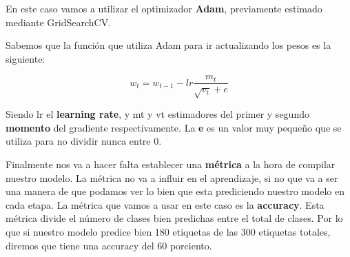 En este caso vamos a utilizar el optimizador \textbf{Adam}, previamente estimado mediante GridSearchCV.

\vspace{5 mm}

Sabemos que la función que utiliza Adam para ir actualizando los pesos es la siguiente:

\[w_t = w_{t-1} - lr  \frac{m_t}{\sqrt{v_t} + e} \]

Siendo lr el \textbf{learning rate}, y mt y vt estimadores del primer y segundo \textbf{momento} del gradiente respectivamente. La \textbf{e} es un valor muy pequeño que se utiliza para no dividir nunca entre 0.

\vspace{5 mm}

Finalmente nos va a hacer falta establecer una \textbf{métrica} a la hora de compilar nuestro modelo. La métrica no va a influir en el aprendizaje, si no que va a ser una manera de que podamos ver lo bien que esta prediciendo nuestro modelo en cada etapa. La métrica que vamos a usar en este caso es la \textbf{accuracy}. Esta métrica divide el número de clases bien predichas entre el total de clases. Por lo que si nuestro modelo predice bien 180 etiquetas de las 300 etiquetas totales, diremos que tiene una accuracy del 60 porciento.